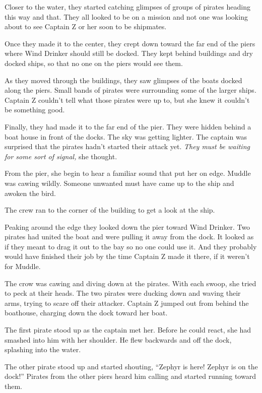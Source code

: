\documentclass[12pt]{extbook}
\begin{document}
  Closer to the water, they started catching glimpses of groups of pirates
  heading this way and that. They all looked to be on a mission and not
  one was looking about to see Captain Z or her soon to be shipmates.
  
  Once they made it to the center, they crept down toward the far end of
  the piers where Wind Drinker should still be docked. They kept behind
  buildings and dry docked ships, so that no one on the piers would see
  them.
  
  As they moved through the buildings, they saw glimpses of the boats
  docked along the piers. Small bands of pirates were surrounding some of
  the larger ships. Captain Z couldn't tell what those pirates were up to,
  but she knew it couldn't be something good.
  
  Finally, they had made it to the far end of the pier. They were hidden
  behind a boat house in front of the docks. The sky was getting lighter.
  The captain was surprised that the pirates hadn't started their attack
  yet. \emph{They must be waiting for some sort of signal,} she thought.
  
  From the pier, she begin to hear a familiar sound that put her on edge.
  Muddle was cawing wildly. Someone unwanted must have came up to the ship
  and awoken the bird.
  
  The crew ran to the corner of the building to get a look at the ship.
  
  Peaking around the edge they looked down the pier toward Wind Drinker.
  Two pirates had united the boat and were pulling it away from the dock.
  It looked as if they meant to drag it out to the bay so no one could use
  it. And they probably would have finished their job by the time Captain
  Z made it there, if it weren't for Muddle.
  
  The crow was cawing and diving down at the pirates. With each swoop, she
  tried to peck at their heads. The two pirates were ducking down and
  waving their arms, trying to scare off their attacker. Captain Z jumped
  out from behind the boathouse, charging down the dock toward her boat.
  
  The first pirate stood up as the captain met her. Before he could react,
  she had smashed into him with her shoulder. He flew backwards and off
  the dock, splashing into the water.
  
  The other pirate stood up and started shouting, \enquote{Zephyr is here!
  Zephyr is on the dock!} Pirates from the other piers heard him calling
  and started running toward them.
  
\end{document}
